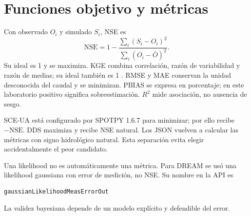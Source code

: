 \chapter{Funciones objetivo y métricas}
Con observado $O_i$ y simulado $S_i$, NSE es
\[\mathrm{NSE}=1-\frac{\sum_i(S_i-O_i)^2}{\sum_i(O_i-\bar O)^2}.\]
Su ideal es 1 y se maximiza. KGE combina correlación, razón de variabilidad y razón de medias; su ideal también es 1 \citep{gupta2009kge}. RMSE y MAE conservan la unidad desconocida del caudal y se minimizan. PBIAS se expresa en porcentaje; en este laboratorio positivo significa sobreestimación. $R^2$ mide asociación, no ausencia de sesgo.

SCE-UA está configurado por SPOTPY 1.6.7 para minimizar; por ello recibe $-\mathrm{NSE}$. DDS maximiza y recibe NSE natural. Los JSON vuelven a calcular las métricas con signo hidrológico natural. Esta separación evita elegir accidentalmente el peor candidato.

Una likelihood no es automáticamente una métrica. Para DREAM se usó una
likelihood gaussiana con error de medición, no NSE. Su nombre en la API es
\begin{lstlisting}
gaussianLikelihoodMeasErrorOut
\end{lstlisting}
La validez bayesiana depende de un modelo explícito y defendible del error.
